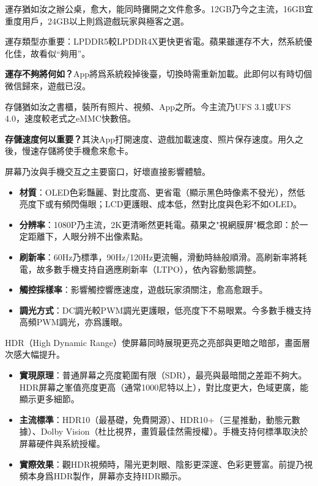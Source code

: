 運存猶如汝之辦公桌，愈大，能同時攤開之文件愈多。12GB乃今之主流，16GB宜重度用戶，24GB以上則爲遊戲玩家與極客之選。

運存類型亦重要：LPDDR5較LPDDR4X更快更省電。蘋果雖運存不大，然系統優化佳，故看似“夠用”。

\textbf{運存不夠將何如？}App將爲系統殺掉後臺，切換時需重新加載。此即何以有時切個微信歸來，遊戲已沒。


存儲猶如汝之書櫃，裝所有照片、視頻、App之所。今主流乃UFS 3.1或UFS 4.0，速度較老式之eMMC快數倍。

\textbf{存儲速度何以重要？}其決App打開速度、遊戲加載速度、照片保存速度。用久之後，慢速存儲將使手機愈來愈卡。


屏幕乃汝與手機交互之主要窗口，好壞直接影響體驗。

\begin{itemize}
  \item \textbf{材質}：OLED色彩豔麗、對比度高、更省電（顯示黑色時像素不發光），然低亮度下或有頻閃傷眼；LCD更護眼、成本低，然對比度與色彩不如OLED。
  \item \textbf{分辨率}：1080P乃主流，2K更清晰然更耗電。蘋果之"視網膜屏"概念即：於一定距離下，人眼分辨不出像素點。
  \item \textbf{刷新率}：60Hz乃標準，90Hz/120Hz更流暢，滑動時絲般順滑。高刷新率將耗電，故多數手機支持自適應刷新率（LTPO），依內容動態調整。
  \item \textbf{觸控採樣率}：影響觸控響應速度，遊戲玩家須關注，愈高愈跟手。
  \item \textbf{調光方式}：DC調光較PWM調光更護眼，低亮度下不易眼累。今多數手機支持高頻PWM調光，亦爲護眼。
\end{itemize}


HDR（High Dynamic Range）使屏幕同時展現更亮之亮部與更暗之暗部，畫面層次感大幅提升。

\begin{itemize}
  \item \textbf{實現原理}：普通屏幕之亮度範圍有限（SDR），最亮與最暗間之差距不夠大。HDR屏幕之峯值亮度更高（通常1000尼特以上），對比度更大，色域更廣，能顯示更多細節。
  \item \textbf{主流標準}：HDR10（最基礎，免費開源）、HDR10+（三星推動，動態元數據）、Dolby Vision（杜比視界，畫質最佳然需授權）。手機支持何標準取決於屏幕硬件與系統授權。
  \item \textbf{實際效果}：觀HDR視頻時，陽光更刺眼、陰影更深邃、色彩更豐富。前提乃視頻本身爲HDR製作，屏幕亦支持HDR顯示。
\end{itemize}

